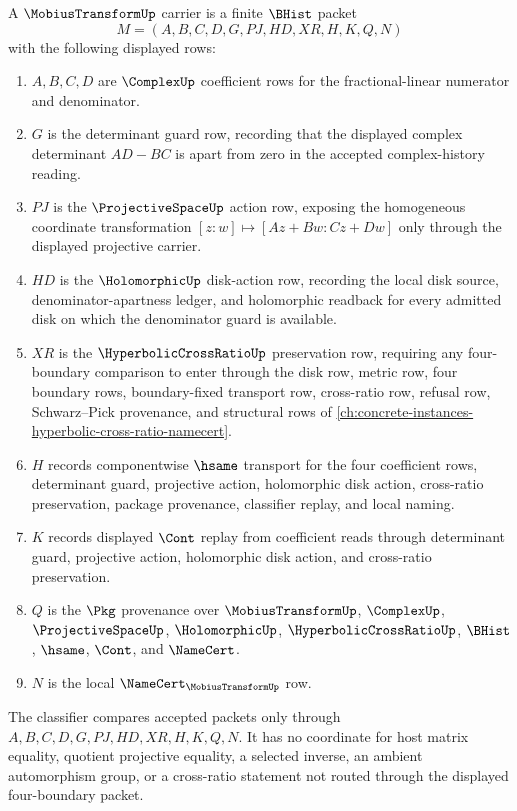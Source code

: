 \begin{definition}
\label{def:mobius-transform-carrier}
A $\MobiusTransformUp$ carrier is a finite $\BHist$ packet
$$
M=(A,B,C,D,G,PJ,HD,XR,H,K,Q,N)
$$
with the following displayed rows:
\begin{enumerate}
\item $A,B,C,D$ are $\ComplexUp$ coefficient rows for the fractional-linear numerator and denominator.
\item $G$ is the determinant guard row, recording that the displayed complex determinant $AD-BC$ is apart from zero in the accepted complex-history reading.
\item $PJ$ is the $\ProjectiveSpaceUp$ action row, exposing the homogeneous coordinate transformation $[z:w]\mapsto [Az+Bw:Cz+Dw]$ only through the displayed projective carrier.
\item $HD$ is the $\HolomorphicUp$ disk-action row, recording the local disk source, denominator-apartness ledger, and holomorphic readback for every admitted disk on which the denominator guard is available.
\item $XR$ is the $\HyperbolicCrossRatioUp$ preservation row, requiring any four-boundary comparison to enter through the disk row, metric row, four boundary rows, boundary-fixed transport row, cross-ratio row, refusal row, Schwarz--Pick provenance, and structural rows of \autoref{ch:concrete-instances-hyperbolic-cross-ratio-namecert}.
\item $H$ records componentwise $\hsame$ transport for the four coefficient rows, determinant guard, projective action, holomorphic disk action, cross-ratio preservation, package provenance, classifier replay, and local naming.
\item $K$ records displayed $\Cont$ replay from coefficient reads through determinant guard, projective action, holomorphic disk action, and cross-ratio preservation.
\item $Q$ is the $\Pkg$ provenance over $\MobiusTransformUp$, $\ComplexUp$, $\ProjectiveSpaceUp$, $\HolomorphicUp$, $\HyperbolicCrossRatioUp$, $\BHist$, $\hsame$, $\Cont$, and $\NameCert$.
\item $N$ is the local $\NameCert_{\MobiusTransformUp}$ row.
\end{enumerate}
The classifier compares accepted packets only through $A,B,C,D,G,PJ,HD,XR,H,K,Q,N$. It has no coordinate for host matrix equality, quotient projective equality, a selected inverse, an ambient automorphism group, or a cross-ratio statement not routed through the displayed four-boundary packet.
\end{definition}

